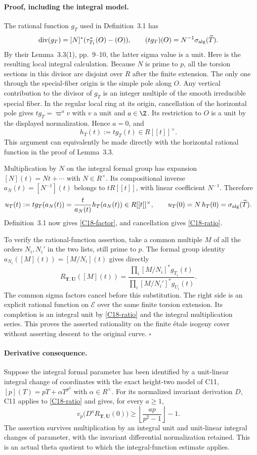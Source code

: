 \paragraph{Proof, including the integral model.}
The rational function $g_T$ used in Definition~3.1 has
\[
 \operatorname{div}(g_T)=[N]^*(\tau_{T_1}^*(O)-(O)),\qquad
 (t g_T)(O)=N^{-1}\sigma_{\rm alg}(\widetilde T).
\]
By their Lemma~3.3(1), pp.~9--10, the latter sigma value is a
unit. Here is the resulting local integral calculation.
Because $N$ is prime to $p$, all the torsion sections in this
divisor are disjoint over $R$ after the finite extension. The
only one through the special-fiber origin is the simple pole
along $O$. Any vertical contribution to the divisor of $g_T$
is an integer multiple of the smooth irreducible special fiber.
In the regular local ring at its origin, cancellation of the
horizontal pole gives $t g_T=\varpi^a v$ with $v$ a unit and
$a\in\Z$. Its restriction to $O$ is a unit by the displayed
normalization. Hence $a=0$, and
\[
 h_T(t):=t g_T(t)\in R[[t]]^\times.
\]
This argument can equivalently be made directly with the
horizontal rational function in the proof of Lemma~3.3.

Multiplication by $N$ on the integral formal group has expansion
$[N](t)=Nt+\cdots$ with $N\in R^\times$. Its compositional inverse
$a_N(t)=[N^{-1}](t)$ belongs to $tR[[t]]$, with linear coefficient
$N^{-1}$. Therefore
\[
 u_T(t):=t g_T(a_N(t))
       =\frac{t}{a_N(t)}h_T(a_N(t))\in R[[t]]^\times,
 \qquad u_T(0)=N\,h_T(0)=\sigma_{\rm alg}(\widetilde T).
\]
Definition~3.1 now gives \eqref{C18-factor}, and cancellation
gives \eqref{C18-ratio}.

To verify the rational-function assertion, take a common multiple
$M$ of all the orders $N_i,N_i'$ in the two lists, still prime
to $p$. The formal group identity
$a_{N_i}([M](t))=[M/N_i](t)$ gives directly
\[
 R_{\mathbf T,\mathbf U}([M](t))=
 \frac{\prod_i[M/N_i]^*g_{T_i}(t)}
      {\prod_i[M/N_i']^*g_{U_i}(t)}.
\]
The common sigma factors cancel before this substitution.
The right side is an explicit rational function on $\mathcal E$
over the same finite torsion extension. Its completion is an
integral unit by \eqref{C18-ratio} and the integral multiplication
series. This proves the asserted rationality on the finite \'etale
isogeny cover without asserting descent to the original curve.
\hfill$\square$

\paragraph{Derivative consequence.}
Suppose the integral formal parameter has been identified by a
unit-linear integral change of coordinates with the exact height-two
model of C11, $[p](T)=pT+\alpha T^{p^2}$ with $\alpha\in R^\times$.
For its normalized invariant derivation $D$, C11 applies to
\eqref{C18-ratio} and gives, for every $a\geq1$,
\[
 v_p\bigl(D^a R_{\mathbf T,\mathbf U}(0)\bigr)
       \geq\left\lfloor\frac{ap}{p^2-1}\right\rfloor-1.
\]
The assertion survives multiplication by an integral unit and
unit-linear integral changes of parameter, with the invariant
differential normalization retained. This is an actual theta
quotient to which the integral-function estimate applies.

